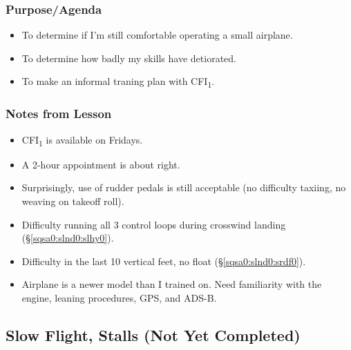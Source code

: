 \documentclass[letterpaper,10pt,titlepage]{article}
\begin{document}

\subsubsection{Purpose/Agenda}
\label{sfle0:sint0:spov0}

\begin{itemize}
\item To determine if I'm still comfortable operating a small airplane.
\item To determine how badly my skills have detiorated.
\item To make an informal traning plan with CFI\textsubscript{1}.
\end{itemize}


\subsubsection{Notes from Lesson}
\label{sfle0:sint0:snff0}

\begin{itemize}
\item CFI\textsubscript{1} is available on Fridays.
\item A 2-hour appointment is about right.
\item Surprisingly, use of rudder pedals is still acceptable (no difficulty taxiing,
      no weaving on takeoff roll).
\item Difficulty running all 3 control loops during crosswind landing
      (\S{}\ref{sqsa0:slnd0:slhy0}).
\item Difficulty in the last 10 vertical feet, no float 
      (\S{}\ref{sqsa0:slnd0:srdf0}).
\item Airplane is a newer model than I trained on.  Need familiarity with the engine,
      leaning procedures, GPS, and ADS-B.	  
\end{itemize}



\subsection{Slow Flight, Stalls (Not Yet Completed)}
\label{sfle0:ssfs0}


\end{document}

